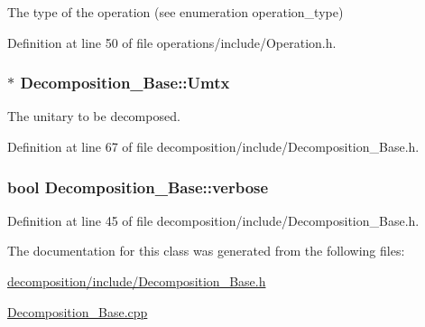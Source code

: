 The type of the operation (see enumeration operation\+\_\+type) 



Definition at line 50 of file operations/include/\+Operation.\+h.

\subsubsection[{\texorpdfstring{Umtx}{Umtx}}]{ $\ast$ Decomposition\+\_\+\+Base\+::\+Umtx\hspace{0.3cm}{\ttfamily [protected]}}\hypertarget{class_decomposition___base_a61a784aaba39276260b3f73709b51ccc}{}\label{class_decomposition___base_a61a784aaba39276260b3f73709b51ccc}


The unitary to be decomposed. 



Definition at line 67 of file decomposition/include/\+Decomposition\+\_\+\+Base.\+h.

\subsubsection[{\texorpdfstring{verbose}{verbose}}]{\setlength{\rightskip}{0pt plus 5cm}bool Decomposition\+\_\+\+Base\+::verbose}\hypertarget{class_decomposition___base_a0636a9e49a19f7167b7abdf309882042}{}\label{class_decomposition___base_a0636a9e49a19f7167b7abdf309882042}


Definition at line 45 of file decomposition/include/\+Decomposition\+\_\+\+Base.\+h.



The documentation for this class was generated from the following files\+:\begin{DoxyCompactItemize}
\item 
\hyperlink{decomposition_2include_2_decomposition___base_8h}{decomposition/include/\+Decomposition\+\_\+\+Base.\+h}\item 
\hyperlink{_decomposition___base_8cpp}{Decomposition\+\_\+\+Base.\+cpp}\end{DoxyCompactItemize}

